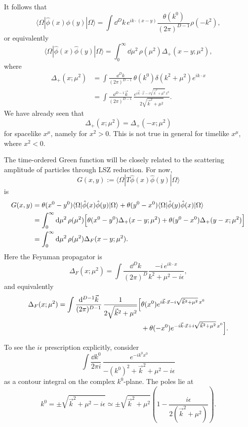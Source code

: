 It follows that
\[
  \langle\Omega|\hat\phi(x)\hat\phi(y)|\Omega\rangle
  =
  \int \dd^D k\,
  e^{ik\cdot(x-y)}
  \frac{\theta(k^0)}{(2\pi)^{D-1}}\rho(-k^2),
\]
or equivalently
\[
  \langle\Omega|\hat\phi(x)\hat\phi(y)|\Omega\rangle
  =
  \int_0^\infty \dd\mu^2\,
  \rho(\mu^2)\Delta_+(x-y;\mu^2),
\]
where
\[
\begin{aligned}
  \Delta_+(x;\mu^2)
  &=
  \int \frac{\dd^D k}{(2\pi)^{D-1}}\,
  \theta(k^0)\delta(k^2+\mu^2)e^{ik\cdot x}  \\
  &=
  \int \frac{\dd^{D-1}\vec k}{(2\pi)^{D-1}}\,
  \frac{
    e^{i\vec k\cdot\vec x-i\sqrt{\vec k^2+\mu^2}\,x^0}
  }{2\sqrt{\vec k^2+\mu^2}} .
\end{aligned}
\]
We have already seen that
\[
  \Delta_+(x;\mu^2)=\Delta_+(-x;\mu^2)
\]
for spacelike \(x^\mu\), namely for \(x^2>0\). This is not true in
general for timelike \(x^\mu\), where \(x^2<0\).

The time-ordered Green function will be closely related to the scattering
amplitude of particles through LSZ reduction. For now,
\[
  G(x,y):=
  \langle\Omega|T\hat\phi(x)\hat\phi(y)|\Omega\rangle
\]
is
\[
\begin{aligned}
  G(x,y)
  &=
  \theta(x^0-y^0)
  \langle\Omega|\hat\phi(x)\hat\phi(y)|\Omega\rangle
  +
  \theta(y^0-x^0)
  \langle\Omega|\hat\phi(y)\hat\phi(x)|\Omega\rangle  \\
  &=
  \int_0^\infty \mathrm{d}\mu^2\,\rho(\mu^2)
  \Bigl[
    \theta(x^0-y^0)\Delta_+(x-y;\mu^2)
    +
    \theta(y^0-x^0)\Delta_+(y-x;\mu^2)
  \Bigr]  \\
  &=
  \int_0^\infty \mathrm{d}\mu^2\,\rho(\mu^2)
  \Delta_F(x-y;\mu^2).
\end{aligned}
\]
Here the Feynman propagator is
\[
  \Delta_F(x;\mu^2)
  =
  \int \frac{\dd^D k}{(2\pi)^D}
  \frac{-i\,e^{ik\cdot x}}{k^2+\mu^2-i\epsilon},
\]
and equivalently
\[
\begin{aligned}
  \Delta_F(x;\mu^2)
  =
  \int \frac{\mathrm{d}^{D-1}\vec k}{(2\pi)^{D-1}}\,
  \frac{1}{2\sqrt{\vec k^2+\mu^2}}
  \Bigl[
    &\theta(x^0)
    e^{i\vec k\cdot\vec x-i\sqrt{\vec k^2+\mu^2}\,x^0}  \\
    &+
    \theta(-x^0)
    e^{-i\vec k\cdot\vec x+i\sqrt{\vec k^2+\mu^2}\,x^0}
  \Bigr].
\end{aligned}
\]

To see the \(i\epsilon\) prescription explicitly, consider
\[
  \int \frac{\dd k^0}{2\pi i}\,
  \frac{e^{-ik^0x^0}}{-(k^0)^2+\vec k^2+\mu^2-i\epsilon}
\]
as a contour integral on the complex \(k^0\)-plane. The poles lie at
\[
  k^0=
  \pm\sqrt{\vec k^2+\mu^2-i\epsilon}
  \simeq
  \pm\sqrt{\vec k^2+\mu^2}
  \left(1-\frac{i\epsilon}{2(\vec k^2+\mu^2)}\right).
\]

